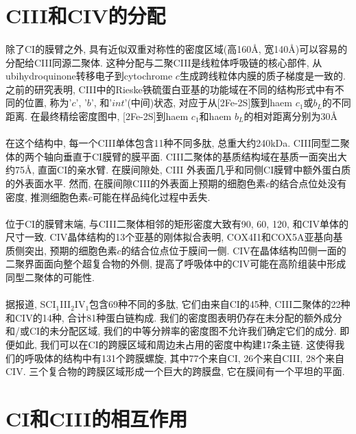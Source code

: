 \documentclass{article}
\begin{document}
\section{CIII和CIV的分配}
  \paragraph{}
    除了CI的膜臂之外, 具有近似双重对称性的密度区域(高160\AA, 宽140\AA)可以容易的分配给CIII同源二聚体. 这种分配与二聚CIII是线粒体呼吸链的核心部件, 从ubihydroquinone转移电子到cytochrome $c$生成跨线粒体内膜的质子梯度是一致的. 之前的研究表明, CIII中的Rieske铁硫蛋白亚基的功能域在不同的结构形式中有不同的位置, 称为'$c$', '$b$', 和'$int$'(中间)状态, 对应于从[2Fe-2S]簇到haem $c_1$或$b_L$的不同距离. 在最终精绘密度图中, [2Fe-2S]到haem $c_1$和haem $b_L$的相对距离分别为30\AA
  \paragraph{}
    在这个结构中, 每一个CIII单体包含11种不同多肽, 总重大约240kDa. CIII同型二聚体的两个轴向垂直于CI膜臂的膜平面. CIII二聚体的基质结构域在基质一面突出大约75\AA, 直面CI的亲水臂. 在膜间隙处, CIII 外表面几乎和同侧CI膜臂中额外蛋白质的外表面水平. 然而, 在膜间隙CIII的外表面上预期的细胞色素$c$的结合点位处没有密度, 推测细胞色素$c$可能在样品纯化过程中丢失.
  \paragraph{}
    位于CI的膜臂末端, 与CIII二聚体相邻的矩形密度大致有90, 60, 120, 和CIV单体的尺寸一致. CIV晶体结构的13个亚基的刚体拟合表明, COX4I1和COX5A亚基向基质侧突出, 预期的细胞色素$c$的结合位点位于膜间一侧. CIV在晶体结构凹侧一面的二聚界面面向整个超复合物的外侧, 提高了呼吸体中的CIV可能在高阶组装中形成同型二聚体的可能性.
  \paragraph{}
    据报道, SCI$_{1}$III$_{2}$IV$_{1}$包含69种不同的多肽, 它们由来自CI的45种, CIII二聚体的22种和CIV的14种, 合计81种蛋白链构成. 我们的密度图表明仍存在未分配的额外成分和/或CI的未分配区域, 我们的中等分辨率的密度图不允许我们确定它们的成分. 即便如此, 我们可以在CI的跨膜区域和周边未占用的密度中构建17条主链. 这使得我们的呼吸体的结构中有131个跨膜螺旋, 其中77个来自CI, 26个来自CIII, 28个来自CIV. 三个复合物的跨膜区域形成一个巨大的跨膜盘, 它在膜间有一个平坦的平面.

\section{CI和CIII的相互作用}
\end{document}
